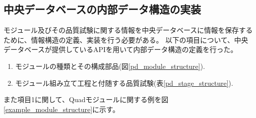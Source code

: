 \subsection{中央データベースの内部データ構造の実装}

モジュール及びその品質試験に関する情報を中央データベースに情報を保存するために、情報構造の定義、実装を行う必要がある。
以下の項目について、中央データベースが提供しているAPIを用いて内部データ構造の定義を行った。
\begin{enumerate}
  \item モジュールの種類とその構成部品(図\ref{pd_module_structure}).
  \item モジュール組み立て工程と付随する品質試験(表\ref{pd_stage_structure}).
\end{enumerate}

また項目1に関して、Quadモジュールに関する例を図\ref{example_module_structure}に示す。

